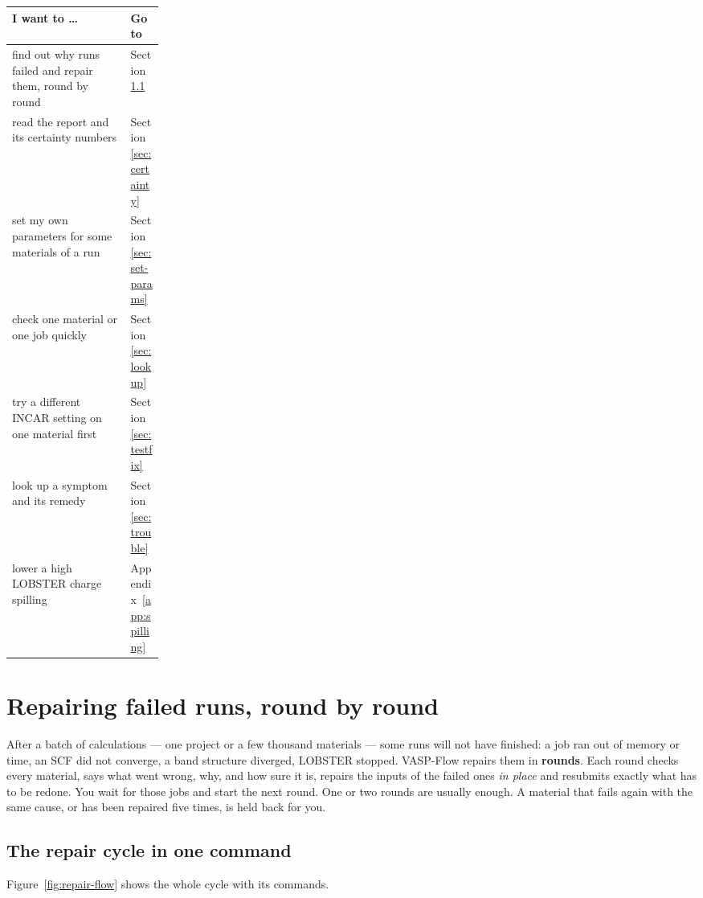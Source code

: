 \documentclass[11pt,a4paper]{scrartcl}
\newcommand{\thead}{\rowcolor{lightblue}}
\begin{document}
\begin{tabularx}{\linewidth}{@{}>{\raggedright\arraybackslash}X>{\raggedright\arraybackslash}p{0.22\linewidth}@{}}
\thead
I want to \ldots & Go to \\ \midrule
find out why runs failed and repair them, round by round & Section~\ref{sec:next-round} \\
read the report and its certainty numbers & Section~\ref{sec:certainty} \\
set my own parameters for some materials of a run & Section~\ref{sec:set-params} \\
check one material or one job quickly & Section~\ref{sec:lookup} \\
try a different INCAR setting on one material first & Section~\ref{sec:testfix} \\
look up a symptom and its remedy & Section~\ref{sec:trouble} \\
lower a high LOBSTER charge spilling & Appendix~\ref{app:spilling} \\
\bottomrule
\end{tabularx}

\section{Repairing failed runs, round by round}
\label{sec:diagnose}

After a batch of calculations --- one project or a few thousand materials ---
some runs will not have finished: a job ran out of memory or time, an SCF did
not converge, a band structure diverged, LOBSTER stopped.  VASP-Flow repairs
them in \textbf{rounds}.  Each round checks every material, says what went wrong,
why, and how sure it is, repairs the inputs of the failed ones \emph{in place} and
resubmits exactly what has to be redone.  You wait for those jobs and start the
next round.  One or two rounds are usually enough.  A material that fails again
with the same cause, or has been repaired five times, is held back for you.

\subsection{The repair cycle in one command}
\label{sec:next-round}

Figure~\ref{fig:repair-flow} shows the whole cycle with its commands.
\end{document}
